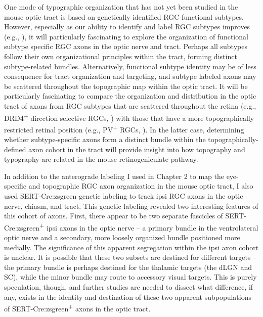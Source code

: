 One mode of typographic organization that has not yet been studied in the mouse optic tract is based on genetically identified RGC functional subtypes.
However, especially as our ability to identify and label RGC subtypes improves (e.g., ), it will particularly fascinating to explore the organization of functional subtype specific RGC axons in the optic nerve and tract.
Perhaps all subtypes follow their own organizational principles within the tract, forming distinct subtype-related bundles.
Alternatively, functional subtype identity may be of less consequence for tract organization and targeting, and subtype labeled axons may be scattered throughout the topographic map within the optic tract.
It will be particularly fascinating to compare the organization and distribution in the optic tract of axons from RGC subtypes that are scattered throughout the retina (e.g., DRD4\textsuperscript{+} direction selective RGCs, ) with those that have a more topographically restricted retinal position (e.g., PV\textsuperscript{+} RGCs, ).
In the latter case, determining whether subtype-specific axons form a distinct bundle within the topographically-defined axon cohort in the tract will provide insight into how topography and typography are related in the mouse retinogeniculate pathway.

In addition to the anterograde labeling I used in Chapter 2 to map the eye-specific and topographic RGC axon organization in the mouse optic tract, I also used SERT-Cre:zsgreen genetic labeling to track ipsi RGC axons in the optic nerve, chiasm, and tract.
This genetic labeling revealed two interesting features of this cohort of axons.
First, there appear to be two separate fascicles of SERT-Cre:zsgreen\textsuperscript{+} ipsi axons in the optic nerve -- a primary bundle in the ventrolateral optic nerve and a secondary, more loosely organized bundle positioned more medially.
The significance of this apparent segregation within the ipsi axon cohort is unclear.
It is possible that these two subsets are destined for different targets -- the primary bundle is perhaps destined for the thalamic targets (the dLGN and SC), while the minor bundle may route to accessory visual targets.
This is purely speculation, though, and further studies are needed to dissect what difference, if any, exists in the identity and destination of these two apparent subpopulations of SERT-Cre:zsgreen\textsuperscript{+} axons in the optic tract.

